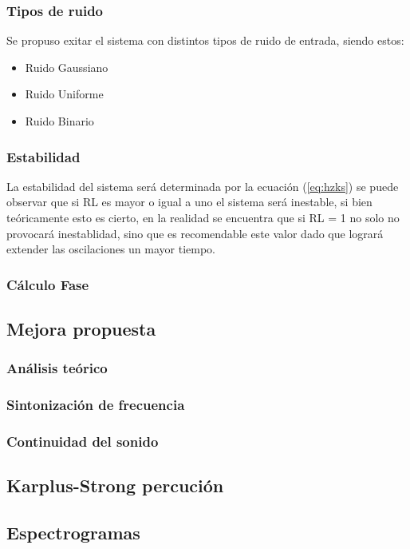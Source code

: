 \subsubsection{Tipos de ruido}
Se propuso exitar el sistema con distintos tipos de ruido de entrada, siendo estos:
\begin{itemize}
\item Ruido Gaussiano
\item Ruido Uniforme
\item Ruido Binario

\end{itemize}
\subsubsection{Estabilidad}
La estabilidad del sistema será determinada por la ecuación (\ref{eq:hzks}) se puede observar que si RL es mayor o igual a uno el sistema será inestable, si bien teóricamente esto es cierto, en la realidad se encuentra que si RL = 1 no solo no provocará inestablidad, sino que es recomendable este valor dado que logrará extender las oscilaciones  un mayor tiempo.
\subsubsection{Cálculo Fase}
\subsection{Mejora propuesta}
\subsubsection{Análisis teórico}
\subsubsection{Sintonización de frecuencia}
\subsubsection{Continuidad del sonido}
\subsection{Karplus-Strong percución}
\subsection{Espectrogramas}
